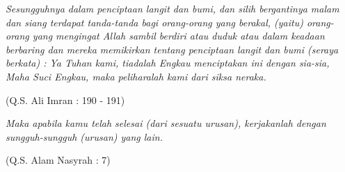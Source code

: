 \documentclass[tesis]{ugmtesis}
\begin{document}
\lstset{language=XML, breaklines=true, keepspaces=true, columns=flexible}

\cover

\titlepageind 

\approvalpage

\declarepage

\acknowledment
\begin{flushright}
\Large\emph{}
\end{flushright}

\motto
\emph{Sesungguhnya dalam penciptaan langit dan bumi, dan silih bergantinya
malam dan siang terdapat tanda-tanda bagi orang-orang yang berakal, (yaitu)
orang-orang yang mengingat Allah sambil berdiri atau duduk atau dalam keadaan
berbaring dan mereka memikirkan tentang penciptaan langit dan bumi (seraya
berkata) : Ya Tuhan kami, tiadalah Engkau menciptakan ini dengan sia-sia, Maha
Suci Engkau, maka peliharalah kami dari siksa neraka.}

\begin{flushright}
(Q.S. Ali Imran : 190 - 191)
\end{flushright}

\emph{Maka apabila kamu telah selesai (dari sesuatu urusan), kerjakanlah
dengan sungguh-sungguh (urusan) yang lain.}

\begin{flushright}
(Q.S. Alam Nasyrah : 7)
\end{flushright}
\end{document}
